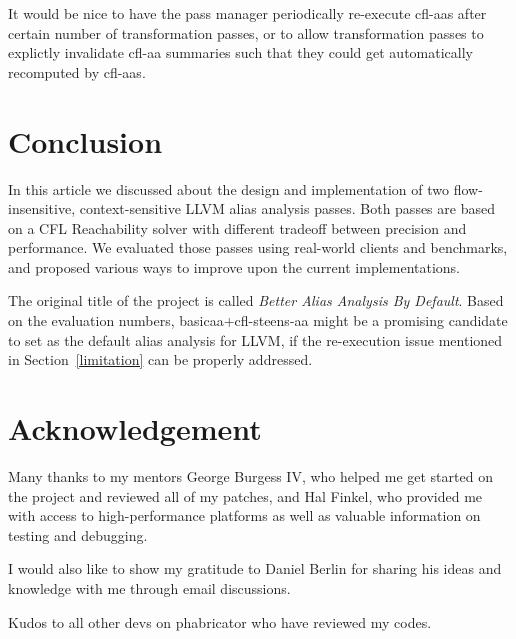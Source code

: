 \documentclass[10pt]{article}
\begin{document}
It would be nice to have the pass manager periodically re-execute cfl-aas after certain
number of transformation passes, or to allow transformation passes
to explictly invalidate cfl-aa summaries such that they could get automatically
recomputed by cfl-aas.

\section{Conclusion}\label{conclusion}

In this article we discussed about the design and implementation of two
flow-insensitive, context-sensitive LLVM alias analysis passes. Both passes are based on a CFL Reachability solver with
different tradeoff between precision and performance. We evaluated those passes
using real-world clients and benchmarks, and proposed various ways to improve upon the current implementations.

The original title of the project is called \emph{Better Alias Analysis By
  Default}. Based on the evaluation numbers, basicaa+cfl-steens-aa might be a promising
candidate to set as the default alias analysis for LLVM, if the re-execution
issue mentioned in Section~\ref{limitation} can be properly addressed.  

\section*{Acknowledgement}

Many thanks to my mentors George Burgess IV, who helped me get
started on the project and reviewed all of my patches, and Hal Finkel, who
provided me with access to high-performance platforms as well as valuable information
on testing and debugging.  

I would also like to show my gratitude to Daniel Berlin for sharing his ideas
and knowledge with me through email discussions.

Kudos to all other devs on phabricator who have reviewed my codes. 

{}

\end{document}
